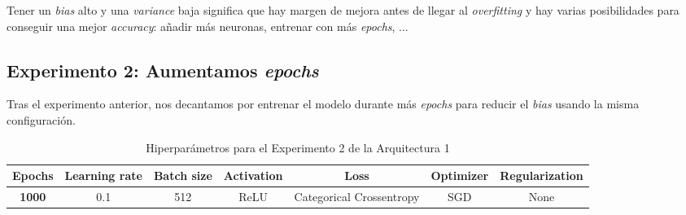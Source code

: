 \documentclass{article}
\begin{document}
			Tener un \textit{bias} alto y una \textit{variance} baja significa que hay margen de mejora antes de llegar al \textit{overfitting} y hay varias posibilidades para conseguir una mejor \textit{accuracy}: a\~nadir m\'as neuronas, entrenar con m\'as \textit{epochs}, ...
		
		\subsection{Experimento 2: Aumentamos \textit{epochs}}
		\label{d-s-a1-e2}
			Tras el experimento anterior, nos decantamos por entrenar el modelo durante m\'as \textit{epochs} para reducir el \textit{bias} usando la misma configuraci\'on.\\
			\begin{table}[!h]
				\begin{center}
					\begin{tabular}{| c | c | c | c | c | c | c |}
						\textbf{Epochs} & \textbf{Learning rate} & \textbf{Batch size} & \textbf{Activation} & \textbf{Loss} & \textbf{Optimizer} & \textbf{Regularization} \\ \hline
						\textbf{1000} & 0.1 & 512 & ReLU & Categorical Crossentropy & SGD & None
					\end{tabular}
					\caption{Hiperpar\'ametros para el Experimento 2 de la Arquitectura 1}
					\label{tab:hip-d-a1-e2}
				\end{center}
			\end{table}
			
\end{document}
